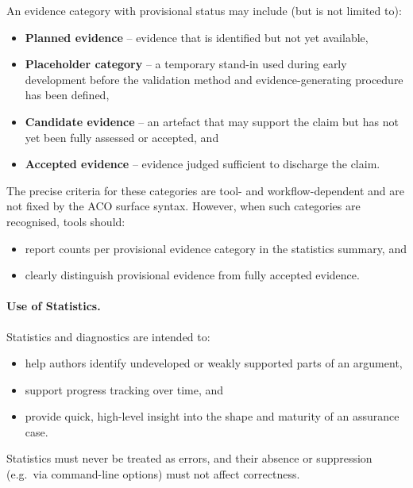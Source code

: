 \documentclass[11pt,twoside,a4paper]{article}
\begin{document}
An evidence category with provisional status may include (but is not limited to):
\begin{itemize}[leftmargin=2em]
  \item \textbf{Planned evidence} -- evidence that is identified but not yet available,
  \item \textbf{Placeholder category} -- a temporary stand-in used during early development before the validation method and evidence-generating procedure has been defined,
  \item \textbf{Candidate evidence} -- an artefact that may support the claim but has not
        yet been fully assessed or accepted, and
  \item \textbf{Accepted evidence} -- evidence judged sufficient to discharge the claim.
\end{itemize}

The precise criteria for these categories are tool- and workflow-dependent and are
not fixed by the ACO surface syntax. However, when such categories are recognised,
tools should:
\begin{itemize}[leftmargin=2em]
  \item report counts per provisional evidence category in the statistics summary, and
  \item clearly distinguish provisional evidence from fully accepted evidence.
\end{itemize}

\paragraph{Use of Statistics.}
Statistics and diagnostics are intended to:
\begin{itemize}[leftmargin=2em]
  \item help authors identify undeveloped or weakly supported parts of an argument,
  \item support progress tracking over time, and
  \item provide quick, high-level insight into the shape and maturity of an assurance case.
\end{itemize}

Statistics must never be treated as errors, and their absence or suppression
(e.g.\ via command-line options) must not affect correctness.
\end{document}
